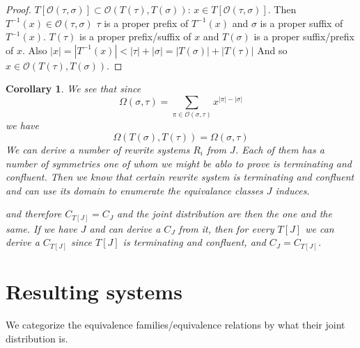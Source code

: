 \documentclass[a4paper, 11pt, english]{article}
\newtheorem{corollary}[theorem]{Corollary}
\theoremstyle{definition}
\newcommand{\Ocal}{\mathcal{O}}
\begin{document}
\begin{appendices}
\begin{proof}
    $T[\Ocal(\tau, \sigma)] \subset \Ocal(T(\tau), T(\sigma))$: 
    $x \in T[\Ocal(\tau, \sigma)]$. Then $T^{-1}(x) \in \Ocal(\tau, \sigma)$
    $\tau$ is a proper prefix of $T^{-1}(x)$ and $\sigma$ is a proper suffix of $T^{-1}(x)$. 
    $T(\tau)$ is a proper prefix/suffix of $x$ and $T(\sigma)$ is a proper suffix/prefix of
    $x$. Also $|x| = |T^{-1}(x)| < |\tau| + |\sigma| = |T(\sigma)| + |T(\tau)|$
    And so $x \in \Ocal(T(\tau), T(\sigma))$.
\end{proof}

\begin{corollary}
    We see that since 
    \[
        \Omega(\sigma, \tau) = \sum_{\pi \in \Ocal(\sigma, \tau)} x^{|\pi|-|\sigma|}
    \]
    we have
    \[
        \Omega(T(\sigma), T(\tau)) = \Omega(\sigma, \tau)
    \]
    We can derive a number of rewrite systems $R_i$ from $J$. Each of them has a number of
    symmetries one of whom we might be ablo to prove is terminating and confluent. Then we know that
    certain rewrite system is terminating and confluent and can use its domain to enumerate the
    equivalance classes $J$ induces.

    and therefore $C_{T[J]} = C_J$ and the joint distribution are then the one and the same.
    If we have $J$ and can derive a $C_J$ from it, then for every $T[J]$ we can
    derive a $C_{T[J]}$ since $T[J]$ is terminating and confluent, and $C_J = C_{T[J]}$.
\end{corollary}

\clearpage

\section{Resulting systems}
We categorize the equivalence families/equivalence relations by what their joint
distribution is.
\begin{multicols}{2}

\end{multicols}
\end{appendices}
\end{document}
